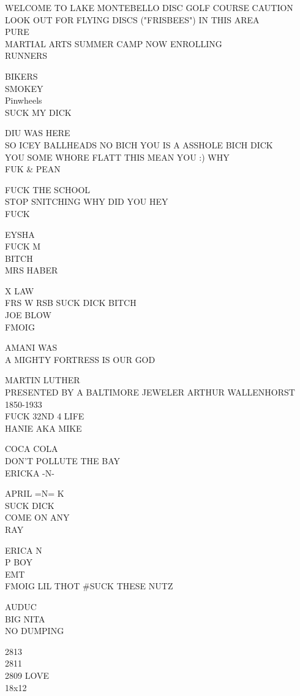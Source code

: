 \documentclass[10pt,letterpaper]{article}
\begin{document}
WELCOME TO LAKE MONTEBELLO DISC GOLF COURSE CAUTION LOOK OUT FOR FLYING DISCS ("FRISBEES") IN THIS AREA\\
PURE\\
MARTIAL ARTS SUMMER CAMP NOW ENROLLING\\
RUNNERS

BIKERS\\
SMOKEY\\
Pinwheels\\
SUCK MY DICK

DIU WAS HERE\\
SO ICEY BALLHEADS NO BICH YOU IS A ASSHOLE BICH DICK\\
YOU SOME WHORE FLATT THIS MEAN YOU :) WHY\\
FUK \& PEAN

FUCK THE SCHOOL\\
STOP SNITCHING WHY DID YOU HEY\\
FUCK

EYSHA\\
FUCK M\\
BITCH\\
MRS HABER

X LAW\\
FRS W RSB SUCK DICK BITCH\\
JOE BLOW\\
FMOIG

AMANI WAS\\
A MIGHTY FORTRESS IS OUR GOD

MARTIN LUTHER\\
PRESENTED BY A BALTIMORE JEWELER ARTHUR WALLENHORST 1850{-}1933\\
FUCK 32ND 4 LIFE\\
HANIE AKA MIKE

COCA COLA\\
DON'T POLLUTE THE BAY\\
ERICKA {-}N{-}

APRIL =N= K\\
SUCK DICK\\
COME ON ANY\\
RAY

ERICA N\\
P BOY\\
EMT\\
FMOIG LIL THOT \#SUCK THESE NUTZ

AUDUC\\
BIG NITA\\
NO DUMPING

2813\\
2811\\
2809 LOVE\\
18x12
\end{document}
